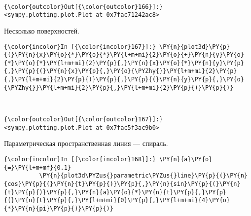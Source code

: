     \begin{center}
    \end{center}
    { \hspace*{\fill} \\}
    
            \begin{Verbatim}[commandchars=\\\{\}]
{\color{outcolor}Out[{\color{outcolor}166}]:} <sympy.plotting.plot.Plot at 0x7fac71242ac8>
\end{Verbatim}
        
    Несколько поверхностей.

    \begin{Verbatim}[commandchars=\\\{\}]
{\color{incolor}In [{\color{incolor}167}]:} \PY{n}{plot3d}\PY{p}{(}\PY{n}{x}\PY{o}{*}\PY{o}{*}\PY{l+m+mi}{2}\PY{o}{+}\PY{n}{y}\PY{o}{*}\PY{o}{*}\PY{l+m+mi}{2}\PY{p}{,}\PY{n}{x}\PY{o}{*}\PY{n}{y}\PY{p}{,}\PY{p}{(}\PY{n}{x}\PY{p}{,}\PY{o}{\PYZhy{}}\PY{l+m+mi}{2}\PY{p}{,}\PY{l+m+mi}{2}\PY{p}{)}\PY{p}{,}\PY{p}{(}\PY{n}{y}\PY{p}{,}\PY{o}{\PYZhy{}}\PY{l+m+mi}{2}\PY{p}{,}\PY{l+m+mi}{2}\PY{p}{)}\PY{p}{)}
\end{Verbatim}

    \begin{center}
    \end{center}
    { \hspace*{\fill} \\}
    
            \begin{Verbatim}[commandchars=\\\{\}]
{\color{outcolor}Out[{\color{outcolor}167}]:} <sympy.plotting.plot.Plot at 0x7fac5f3ac9b0>
\end{Verbatim}
        
    Параметрическая пространственная линия --- спираль.

    \begin{Verbatim}[commandchars=\\\{\}]
{\color{incolor}In [{\color{incolor}168}]:} \PY{n}{a}\PY{o}{=}\PY{l+m+mf}{0.1}
          \PY{n}{plot3d\PYZus{}parametric\PYZus{}line}\PY{p}{(}\PY{n}{cos}\PY{p}{(}\PY{n}{t}\PY{p}{)}\PY{p}{,}\PY{n}{sin}\PY{p}{(}\PY{n}{t}\PY{p}{)}\PY{p}{,}\PY{n}{a}\PY{o}{*}\PY{n}{t}\PY{p}{,}\PY{p}{(}\PY{n}{t}\PY{p}{,}\PY{l+m+mi}{0}\PY{p}{,}\PY{l+m+mi}{4}\PY{o}{*}\PY{n}{pi}\PY{p}{)}\PY{p}{)}
\end{Verbatim}


